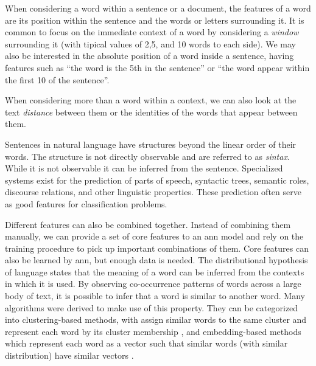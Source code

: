 When considering a word within a sentence or a document, the features
of a word are its position within the sentence and the words or
letters surrounding it. It is common to focus on the immediate context
of a word by considering a \emph{window} surrounding it (with tipical
values of 2,5, and 10 words to each side). We may also be interested
in the absolute position of a word inside a sentence, having features
such as ``the word is the 5th in the sentence'' or ``the word appear
within the first 10 of the sentence''.

When considering more than a word within a context, we can also look
at the text \emph{distance} between them or the identities of the
words that appear between them.

Sentences in natural language have structures beyond the linear order
of their words. The structure is not directly observable and are
referred to as \emph{sintax}. While it is not observable it can be
inferred from the sentence. Specialized systems exist for the
prediction of parts of speech, syntactic trees, semantic roles,
discourse relations, and other linguistic properties. These prediction
often serve as good features for classification problems.

Different features can also be combined together. Instead of combining
them manually, we can provide a set of core features to an \ac{ann}
model and rely on the training procedure to pick up important
combinations of them.
Core features can also be learned by \ac{ann}, but enough data is
needed. The distributional hypothesis of language states that the
meaning of a word can be inferred from the contexts in which it is
used. By observing co-occurrence patterns of words across a large body
of text, it is possible to infer that a word is similar to another
word. Many algorithms were derived to make use of this property. They
can be categorized into clustering-based methods, with assign similar
words to the same cluster and represent each word by its cluster
membership \cite{miller2004name}, and embedding-based methods which
represent each word as a 
vector such that similar words (with similar distribution) have
similar vectors \cite{pennington_glove:_2014,mikolov_linguistic_2013}.

